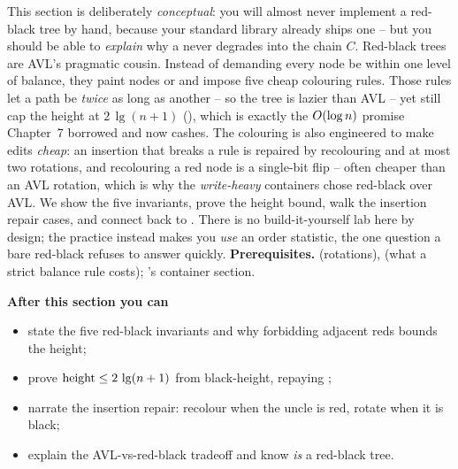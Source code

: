\begin{topicintro}
This section is deliberately \emph{conceptual}: you will almost never implement a red-black tree by hand,
because your standard library already ships one -- but you should be able to \emph{explain} why a
 never degrades into the chain $C$. Red-black trees are AVL's pragmatic cousin. Instead of
demanding every node be within one level of balance, they paint nodes  or  and impose
five cheap colouring rules. Those rules let a path be \emph{twice} as long as another -- so the tree is
lazier than AVL -- yet still cap the height at $2\,\lg(n+1)$ (), which is exactly the
$O(\log n)$ promise Chapter~7 borrowed and now cashes. The colouring is also engineered to make edits
\emph{cheap}: an insertion that breaks a rule is repaired by recolouring and at most two rotations, and
recolouring a red node is a single-bit flip -- often cheaper than an AVL rotation, which is why the
\emph{write-heavy} containers chose red-black over AVL. We show the five invariants, prove the height
bound, walk the insertion repair cases, and connect back to . There is no
build-it-yourself lab here by design; the practice instead makes you \emph{use} an order statistic, the
one question a bare red-black  refuses to answer quickly.
\textbf{Prerequisites.}  (rotations),  (what a strict balance rule
costs); 's container section.

\textbf{After this section you can}
\begin{itemize}[nosep]
  \item state the five red-black invariants and why forbidding adjacent reds bounds the height; \hfill{}
  \item prove $\operatorname{height} \le 2\,\lg(n+1)$ from black-height, repaying ; \hfill{}
  \item narrate the insertion repair: recolour when the uncle is red, rotate when it is black; \hfill{}
  \item explain the AVL-vs-red-black tradeoff and know  \emph{is} a red-black tree. \hfill{}
\end{itemize}
\end{topicintro}

